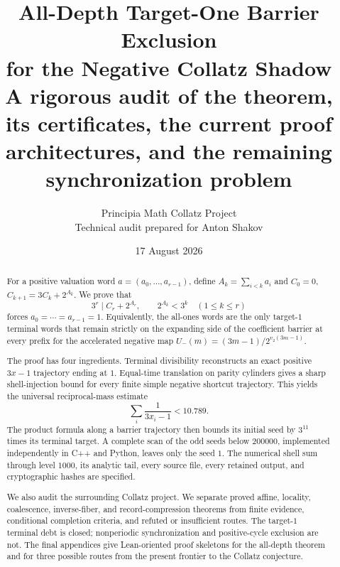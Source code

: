 \documentclass[11pt]{article}
\title{\textbf{All-Depth Target-One Barrier Exclusion\\for the Negative Collatz Shadow}\\[0.4em]
\large A rigorous audit of the theorem, its certificates, the current proof architectures, and the remaining synchronization problem}
\author{Principia Math Collatz Project\\Technical audit prepared for Anton Shakov}
\date{17 August 2026}
\theoremstyle{definition}
\theoremstyle{remark}
\newcommand{\Um}{U_{-}}
\newcommand{\vTwo}{v_2}
\begin{document}
\maketitle

\begin{center}
\end{center}

\begin{abstract}
For a positive valuation word $a=(a_0,\ldots,a_{r-1})$, define
$A_k=\sum_{i<k}a_i$ and $C_0=0$, $C_{k+1}=3C_k+2^{A_k}$.
We prove that
\[
  3^r\mid C_r+2^{A_r},\qquad
  2^{A_k}<3^k\quad(1\le k\le r)
\]
forces $a_0=\cdots=a_{r-1}=1$.
Equivalently, the all-ones words are the only target-$1$ terminal words that
remain strictly on the expanding side of the coefficient barrier at every
prefix for the accelerated negative map
$\Um(m)=(3m-1)/2^{\vTwo(3m-1)}$.

The proof has four ingredients.  Terminal divisibility reconstructs an exact
positive $3x-1$ trajectory ending at $1$.  Equal-time translation on parity
cylinders gives a sharp shell-injection bound for every finite simple
negative shortcut trajectory.  This yields the universal reciprocal-mass
estimate
\[
  \sum_i\frac1{3x_i-1}<10.789.
\]
The product formula along a barrier trajectory then bounds its initial seed
by $3^{11}$ times its terminal target.  A complete scan of the odd seeds below
$200000$, implemented independently in C++ and Python, leaves only the seed
$1$.  The numerical shell sum through level $1000$, its analytic tail, every
source file, every retained output, and cryptographic hashes are specified.

We also audit the surrounding Collatz project.  We separate proved affine,
locality, coalescence, inverse-fiber, and record-compression theorems from
finite evidence, conditional completion criteria, and refuted or insufficient
routes.  The target-$1$ terminal debt is closed; nonperiodic synchronization
and positive-cycle exclusion are not.  The final appendices give Lean-oriented
proof skeletons for the all-depth theorem and for three possible routes from
the present frontier to the Collatz conjecture.
\end{abstract}
\end{document}
